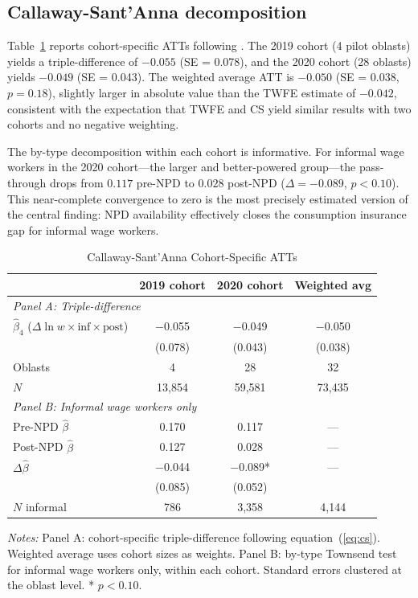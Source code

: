 \documentclass[12pt]{article}
\begin{document}
\subsection{Callaway-Sant'Anna decomposition}

Table~\ref{tab:cs_results} reports cohort-specific ATTs following \citet{CallawayS2021}. The 2019 cohort (4 pilot oblasts) yields a triple-difference of $-0.055$ (SE = 0.078), and the 2020 cohort (28 oblasts) yields $-0.049$ (SE = 0.043). The weighted average ATT is $-0.050$ (SE = 0.038, $p = 0.18$), slightly larger in absolute value than the TWFE estimate of $-0.042$, consistent with the expectation that TWFE and CS yield similar results with two cohorts and no negative weighting.

The by-type decomposition within each cohort is informative. For informal wage workers in the 2020 cohort---the larger and better-powered group---the pass-through drops from $0.117$ pre-NPD to $0.028$ post-NPD ($\Delta = -0.089$, $p < 0.10$). This near-complete convergence to zero is the most precisely estimated version of the central finding: NPD availability effectively closes the consumption insurance gap for informal wage workers.

\begin{table}[htbp]
\centering
\caption{Callaway-Sant'Anna Cohort-Specific ATTs}
\label{tab:cs_results}
\small
\begin{tabular}{lccc}
\toprule
 & 2019 cohort & 2020 cohort & Weighted avg \\
\midrule
\multicolumn{4}{l}{\textit{Panel A: Triple-difference}} \\[4pt]
$\hat{\beta}_4$ ($\Delta \ln w \times \text{inf} \times \text{post}$) & $-$0.055 & $-$0.049 & $-$0.050 \\
 & (0.078) & (0.043) & (0.038) \\[4pt]
Oblasts & 4 & 28 & 32 \\
$N$ & 13,854 & 59,581 & 73,435 \\[8pt]
\multicolumn{4}{l}{\textit{Panel B: Informal wage workers only}} \\[4pt]
Pre-NPD $\hat{\beta}$ & 0.170 & 0.117 & --- \\
Post-NPD $\hat{\beta}$ & 0.127 & 0.028 & --- \\
$\Delta\hat{\beta}$ & $-$0.044 & $-$0.089* & --- \\
 & (0.085) & (0.052) & \\
$N$ informal & 786 & 3,358 & 4,144 \\
\bottomrule
\end{tabular}
\begin{minipage}{0.9\textwidth}
\vspace{0.3em}
\footnotesize \textit{Notes:} Panel A: cohort-specific triple-difference following equation~(\ref{eq:cs}). Weighted average uses cohort sizes as weights. Panel B: by-type Townsend test for informal wage workers only, within each cohort. Standard errors clustered at the oblast level. * $p < 0.10$.
\end{minipage}
\end{table}
\end{document}
